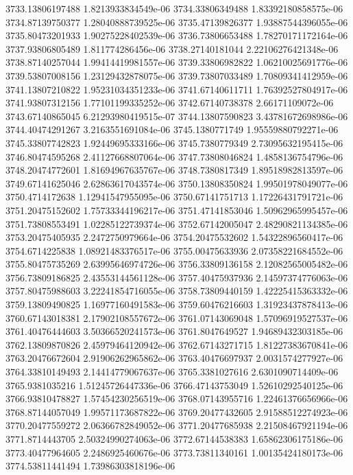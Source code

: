 {3733.13806197488 1.8213933834549e-06
3734.33806349488 1.83392180858575e-06
3734.87139750377 1.28040888739525e-06
3735.47139826377 1.93887544396055e-06
3735.80473201933 1.90275228402539e-06
3736.73806653488 1.78270171172164e-06
3737.93806805489 1.811774286456e-06
3738.27140181044 2.22106276421348e-06
3738.87140257044 1.99414419981557e-06
3739.33806982822 1.06210025691776e-06
3739.53807008156 1.23129432878075e-06
3739.73807033489 1.70809341412959e-06
3741.13807210822 1.95231034351233e-06
3741.67140611711 1.76392527804917e-06
3741.93807312156 1.77101199335252e-06
3742.67140738378 2.66171109072e-06
3743.67140865045 6.21293980419515e-07
3744.13807590823 3.43781672698986e-06
3744.40474291267 3.2163551691084e-06
3745.1380771749 1.95559880792271e-06
3745.33807742823 1.92449695333166e-06
3745.7380779349 2.73095632195415e-06
3746.80474595268 2.41127668807064e-06
3747.73808046824 1.4858136754796e-06
3748.20474772601 1.81694967635767e-06
3748.7380817349 1.89518982813597e-06
3749.67141625046 2.62863617043574e-06
3750.13808350824 1.99501978049077e-06
3750.4714172638 1.12941547955095e-06
3750.67141751713 1.17226431791721e-06
3751.20475152602 1.75733344196217e-06
3751.47141853046 1.50962965995457e-06
3751.73808553491 1.02285122739374e-06
3752.67142005047 2.48290821134385e-06
3753.20475405935 2.2472750979664e-06
3754.20475532602 1.54322896560417e-06
3754.6714225838 1.08921483376517e-06
3755.00475633936 2.07358221684552e-06
3755.80475735269 2.63995646974726e-06
3756.33809136158 2.12082565005482e-06
3756.73809186825 2.43553144561128e-06
3757.40475937936 2.14597374776063e-06
3757.80475988603 3.22241854716055e-06
3758.73809440159 1.42225415363332e-06
3759.13809490825 1.16977160491583e-06
3759.60476216603 1.31923437878413e-06
3760.67143018381 2.17902108557672e-06
3761.07143069048 1.57096919527537e-06
3761.40476444603 3.50366520241573e-06
3761.8047649527 1.94689432303185e-06
3762.13809870826 2.45979464120942e-06
3762.67143271715 1.81227383670841e-06
3763.20476672604 2.91906262965862e-06
3763.40476697937 2.0031574277927e-06
3764.33810149493 2.14414779067637e-06
3765.3381027616 2.6301090714409e-06
3765.9381035216 1.51245726447336e-06
3766.47143753049 1.52610292540125e-06
3766.93810478827 1.57454230256519e-06
3768.07143955716 1.22461376656966e-06
3768.87144057049 1.99571173687822e-06
3769.20477432605 2.91588512274923e-06
3770.20477559272 2.06366782849052e-06
3771.20477685938 2.21508467921194e-06
3771.8714443705 2.50324990274063e-06
3772.67144538383 1.65862306175186e-06
3773.40477964605 2.2486925460676e-06
3773.73811340161 1.00135424180173e-06
3774.53811441494 1.73986303818196e-06
}
